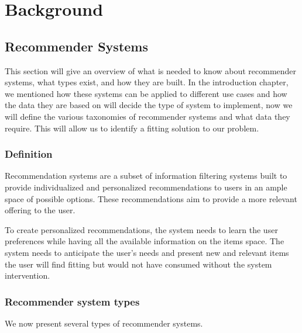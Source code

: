 \documentclass{kththesis}
\begin{document}
\chapter{Background}
\section{Recommender Systems}
This section will give an overview of what is needed to know about recommender systems, what types exist, and how they are built. In the introduction chapter, we mentioned how these systems can be applied to different use cases and how the data they are based on will decide the type of system to implement, now we will define the various taxonomies of recommender systems and what data they require. This will allow us to identify a fitting solution to our problem.

\subsection{Definition}
Recommendation systems are a subset of information filtering systems built to provide individualized and personalized recommendations to users in an ample space of possible options. These recommendations aim to provide a more relevant offering to the user.

To create personalized recommendations, the system needs to learn the user preferences while having all the available information on the items space. The system needs to anticipate the user's needs and present new and relevant items the user will find fitting but would not have consumed without the system intervention.

\subsection{Recommender system types}

We now present several types of recommender systems.
\end{document}

